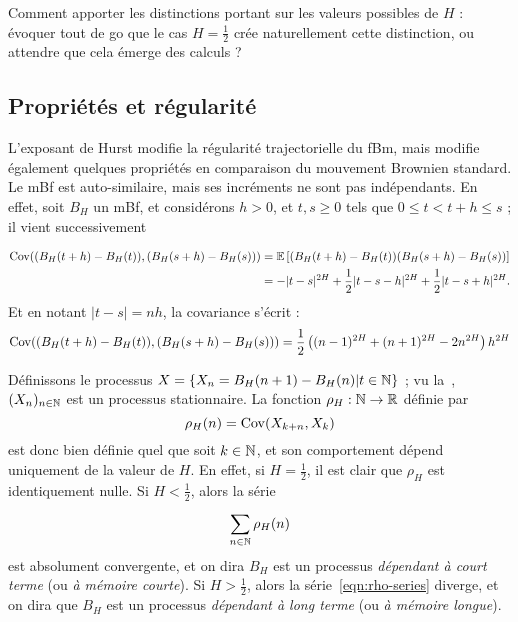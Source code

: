 \begin{question}
  Comment apporter les distinctions portant sur les valeurs possibles
  de $H$ : évoquer tout de go que le cas $H=\frac{1}{2}$ crée
  naturellement cette distinction, ou attendre que cela émerge des
  calculs ?
\end{question}

\subsection{Propriétés et régularité}
L'exposant de Hurst modifie la régularité trajectorielle du fBm, mais
modifie également quelques propriétés en comparaison du mouvement
Brownien standard. Le mBf est auto-similaire, mais ses incréments ne
sont pas indépendants. En effet, soit $B_H$ un mBf, et considérons
$h>0$, et $t,s\geq 0$ tels que $0\leq t<t+h\leq s$ ; il vient
successivement

\begin{align*}
  \operatorname{Cov}((B_H(t+h)-B_H(t)),(B_H(s+h)-B_H(s))) &= \mathbb{E}\left[(B_H(t+h)-B_H(t))(B_H(s+h)-B_H(s))\right] \\
                                            &= -|t-s|^{2H}+\frac{1}{2}|t-s-h|^{2H}+\frac{1}{2}|t-s+h|^{2H}.
\end{align*}
Et en notant $|t-s|=nh$, la covariance s'écrit :
\begin{equation*}
  \operatorname{Cov}((B_H(t+h)-B_H(t)),(B_H(s+h)-B_H(s))) = \frac{1}{2}\left((n-1)^{2H} + (n+1)^{2H} - 2n^{2H}\right)h^{2H}
\end{equation*}

Définissons le processus
$X = \left\{X_n = B_H(n+1)-B_H(n) | t\in\mathbb{N}\right\}$ ; vu
la~, $(X_n)_{n\in\mathbb{N}}$ est un
processus stationnaire. La fonction $\rho_H:\mathbb{N}\to\mathbb{R}$ définie par
\begin{equation*}
  \rho_H(n) = \operatorname{Cov}(X_{k+n}, X_k)
\end{equation*}
est donc bien définie quel que soit $k\in\mathbb{N}$, et son comportement
dépend uniquement de la valeur de $H$. En effet, si $H=\frac{1}{2}$,
il est clair que $\rho_H$ est identiquement nulle. Si $H<\frac{1}{2}$, alors la série
\begin{equation}
  \label{eqn:rho-series}
  \sum_{n\in\mathbb{N}}^{} \rho_H(n)
\end{equation}
est absolument convergente, et on dira $B_H$ est un processus
\emph{dépendant à court terme} (ou \emph{à mémoire courte}). Si
$H>\frac{1}{2}$, alors la série~\ref{eqn:rho-series} diverge, et on
dira que $B_H$ est un processus \emph{dépendant à long terme} (ou
\emph{à mémoire longue}).

